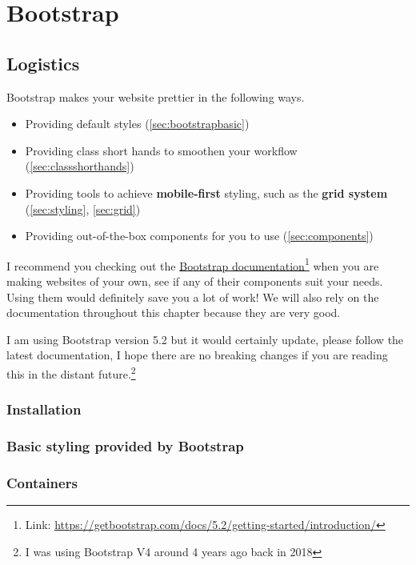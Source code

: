\chapter{Bootstrap}

\section{Logistics}

Bootstrap makes your website prettier in the following ways.

\begin{itemize}
\item Providing default styles (\cref{sec:bootstrapbasic})
\item Providing class short hands to smoothen your workflow (\cref{sec:classshorthands})
\item Providing tools to achieve \textbf{mobile-first} styling, such as the \textbf{grid system} (\cref{sec:styling}, \cref{sec:grid})
\item Providing 
out-of-the-box components for you to use (\cref{sec:components})
\end{itemize}

I recommend you checking out the \href{https://getbootstrap.com/docs/5.2/getting-started/introduction/}{Bootstrap documentation}\footnote{Link: \url{https://getbootstrap.com/docs/5.2/getting-started/introduction/}} when you are making websites of your own, see if any of their components suit your needs. Using them would definitely save you a lot of work! We will also rely on the documentation throughout this chapter because they are very good.

I am using Bootstrap version 5.2 but it would certainly update, please follow the latest documentation, I hope there are no breaking changes if you are reading this in the distant future.\footnote{I was using Bootstrap V4 around 4 years ago back in 2018}

\subsection*{Installation}
\label{sec:bootstrapbasic}

\subsection*{Basic styling provided by Bootstrap}

\subsection*{Containers}
\label{sec:container}



